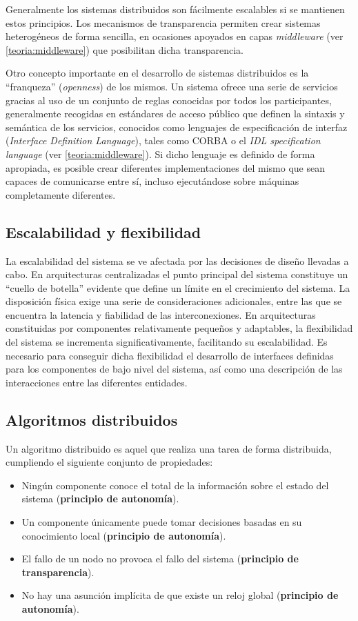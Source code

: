 Generalmente los sistemas distribuidos son fácilmente escalables si se mantienen estos principios. Los mecanismos de transparencia permiten crear sistemas heterogéneos de forma sencilla, en ocasiones apoyados en capas \textit{middleware} (ver \ref{teoria:middleware}) que posibilitan dicha transparencia.

Otro concepto importante en el desarrollo de sistemas distribuidos es la ``franqueza'' (\textit{openness}) de los mismos. Un sistema ofrece una serie de servicios gracias al uso de un conjunto de reglas conocidas por todos los participantes, generalmente recogidas en estándares de acceso público que definen la sintaxis y semántica de los servicios, conocidos como lenguajes de especificación de interfaz (\textit{Interface Definition Language}), tales como CORBA\cite{corba} o el \textit{IDL specification language}\cite{idl} (ver \ref{teoria:middleware}). Si dicho lenguaje es definido de forma apropiada, es posible crear diferentes implementaciones del mismo que sean capaces de comunicarse entre sí, incluso ejecutándose sobre máquinas completamente diferentes.

\subsection{Escalabilidad y flexibilidad}

La escalabilidad del sistema se ve afectada por las decisiones de diseño llevadas a cabo. En arquitecturas centralizadas el punto principal del sistema constituye un ``cuello de botella'' evidente que define un límite en el crecimiento del sistema. La disposición física exige una serie de consideraciones adicionales, entre las que se encuentra la latencia y fiabilidad de las interconexiones. En arquitecturas constituidas por componentes relativamente pequeños y  adaptables, la flexibilidad del sistema se incrementa significativamente, facilitando su escalabilidad. Es necesario para conseguir dicha flexibilidad el desarrollo de interfaces definidas para los componentes de bajo nivel del sistema, así como una descripción de las interacciones entre las diferentes entidades.

\subsection{Algoritmos distribuidos}

Un algoritmo distribuido es aquel que realiza una tarea de forma distribuida, cumpliendo el siguiente conjunto de propiedades:
\begin{itemize}
  \item Ningún componente conoce el total de la información sobre el estado del sistema (\textbf{principio de autonomía}).
  \item Un componente únicamente puede tomar decisiones basadas en su conocimiento local (\textbf{principio de autonomía}).
  \item El fallo de un nodo no provoca el fallo del sistema (\textbf{principio de transparencia}).
  \item No hay una asunción implícita de que existe un reloj global (\textbf{principio de autonomía}).
\end{itemize}

